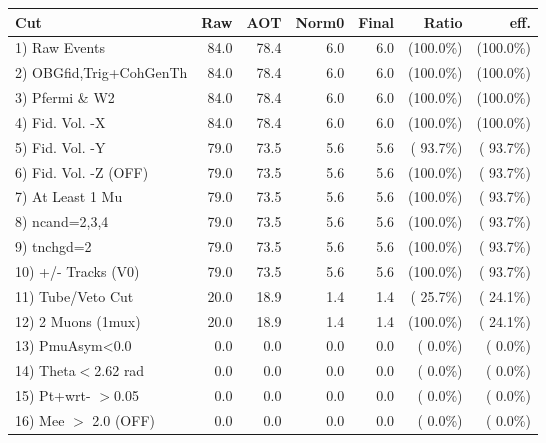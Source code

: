  \begin{table}[h!]\centering
 \begin{tabular}{||l||r|r|r|r|r|r||}
 \hline
 \hline
 Cut & Raw & AOT & Norm0 & Final & Ratio & eff.       \\
 \hline
  1) Raw Events           &         84.0 &         78.4 &          6.0 &          6.0 & (100.0\%) & (100.0\%) \\
  2) OBGfid,Trig+CohGenTh &         84.0 &         78.4 &          6.0 &          6.0 & (100.0\%) & (100.0\%) \\
  3) Pfermi \& W2         &         84.0 &         78.4 &          6.0 &          6.0 & (100.0\%) & (100.0\%) \\
  4) Fid. Vol. -X         &         84.0 &         78.4 &          6.0 &          6.0 & (100.0\%) & (100.0\%) \\
  5) Fid. Vol. -Y         &         79.0 &         73.5 &          5.6 &          5.6 & ( 93.7\%) & ( 93.7\%) \\
  6) Fid. Vol. -Z (OFF)   &         79.0 &         73.5 &          5.6 &          5.6 & (100.0\%) & ( 93.7\%) \\
  7) At Least 1 Mu        &         79.0 &         73.5 &          5.6 &          5.6 & (100.0\%) & ( 93.7\%) \\
  8) ncand=2,3,4          &         79.0 &         73.5 &          5.6 &          5.6 & (100.0\%) & ( 93.7\%) \\
  9) tnchgd=2             &         79.0 &         73.5 &          5.6 &          5.6 & (100.0\%) & ( 93.7\%) \\
 10) +/- Tracks (V0)      &         79.0 &         73.5 &          5.6 &          5.6 & (100.0\%) & ( 93.7\%) \\
 11) Tube/Veto Cut        &         20.0 &         18.9 &          1.4 &          1.4 & ( 25.7\%) & ( 24.1\%) \\
 12) 2 Muons (1mux)       &         20.0 &         18.9 &          1.4 &          1.4 & (100.0\%) & ( 24.1\%) \\
 13) PmuAsym<0.0          &          0.0 &          0.0 &          0.0 &          0.0 & (  0.0\%) & (  0.0\%) \\
 14) Theta$<$2.62 rad     &          0.0 &          0.0 &          0.0 &          0.0 & (  0.0\%) & (  0.0\%) \\
 15) Pt+wrt- $>$0.05      &          0.0 &          0.0 &          0.0 &          0.0 & (  0.0\%) & (  0.0\%) \\
 16) Mee $>$ 2.0  (OFF)   &          0.0 &          0.0 &          0.0 &          0.0 & (  0.0\%) & (  0.0\%) \\

\end{tabular}
\end{table}
